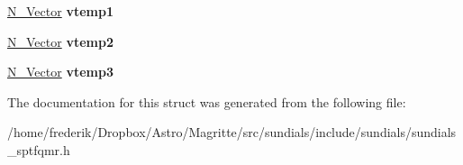 \begin{DoxyCompactItemize}
\item 
\mbox{\label{structSptfqmrMemRec_a0ed8ecc502d7ac82df2575ad8931ffd2}} 
\mbox{\hyperlink{struct__generic__N__Vector}{N\+\_\+\+Vector}} {\bfseries vtemp1}
\item 
\mbox{\label{structSptfqmrMemRec_a342b878776b302f4940aa1ee4b4bf129}} 
\mbox{\hyperlink{struct__generic__N__Vector}{N\+\_\+\+Vector}} {\bfseries vtemp2}
\item 
\mbox{\label{structSptfqmrMemRec_a317462470685e11a7b3442a1da89c369}} 
\mbox{\hyperlink{struct__generic__N__Vector}{N\+\_\+\+Vector}} {\bfseries vtemp3}
\end{DoxyCompactItemize}


The documentation for this struct was generated from the following file\+:\begin{DoxyCompactItemize}
\item 
/home/frederik/\+Dropbox/\+Astro/\+Magritte/src/sundials/include/sundials/sundials\+\_\+sptfqmr.\+h\end{DoxyCompactItemize}
